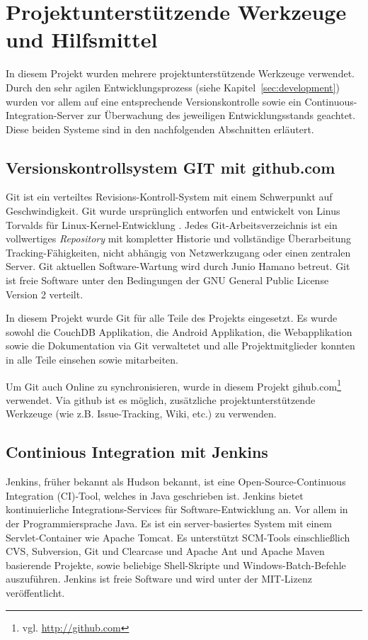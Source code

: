 \section{Projektunterstützende Werkzeuge und Hilfsmittel}
\label{sec:tools}

In diesem Projekt wurden mehrere projektunterstützende Werkzeuge verwendet.
	Durch den sehr agilen Entwicklungsprozess (siehe Kapitel~\ref{sec:development})
	wurden vor allem auf eine entsprechende Versionskontrolle sowie ein
	Continuous-Integration-Server zur Überwachung des jeweiligen Entwicklungsstands
	geachtet. Diese beiden Systeme sind in den nachfolgenden Abschnitten erläutert.

\subsection{Versionskontrollsystem GIT mit github.com}
\label{subsec:git}

Git ist ein verteiltes Revisions-Kontroll-System mit einem Schwerpunkt auf
	Geschwindigkeit. Git wurde ursprünglich entworfen und
	entwickelt von Linus Torvalds für Linux-Kernel-Entwicklung \cite{Torvalds07}.
	Jedes Git-Arbeitsverzeichnis ist ein vollwertiges \emph{Repository} mit
	kompletter Historie und vollständige Überarbeitung Tracking-Fähigkeiten,
	nicht abhängig von Netzwerkzugang oder einen zentralen Server. Git aktuellen
	Software-Wartung wird durch Junio Hamano betreut. Git ist freie Software unter
	den Bedingungen der GNU General Public License Version 2 verteilt.
	
In diesem Projekt wurde Git für alle Teile des Projekts eingesetzt. Es wurde sowohl
	die CouchDB Applikation, die Android Applikation, die Webapplikation sowie die
	Dokumentation via Git verwaltetet und alle Projektmitglieder konnten in alle
	Teile einsehen sowie mitarbeiten.
	
Um Git auch Online zu synchronisieren, wurde in diesem Projekt
	gihub.com\footnote{vgl. \url{http://github.com}} verwendet. Via github ist es
	möglich, zusätzliche projektunterstützende Werkzeuge (wie z.B. Issue-Tracking,
	Wiki, etc.) zu verwenden.

\subsection{Continious Integration mit Jenkins}
\label{subsec:ci}

Jenkins, früher bekannt als Hudson bekannt, ist eine Open-Source-Continuous
	Integration (CI)-Tool, welches in Java geschrieben ist. Jenkins bietet
	kontinuierliche Integrations-Services für Software-Entwicklung an. Vor
	allem in der Programmiersprache Java. Es ist ein server-basiertes System
	mit einem Servlet-Container wie Apache Tomcat. Es unterstützt SCM-Tools
	einschließlich CVS, Subversion, Git und Clearcase und Apache Ant und Apache
	Maven basierende Projekte, sowie beliebige Shell-Skripte und
	Windows-Batch-Befehle auszuführen. Jenkins ist freie Software und wird
	unter der MIT-Lizenz veröffentlicht.
	
